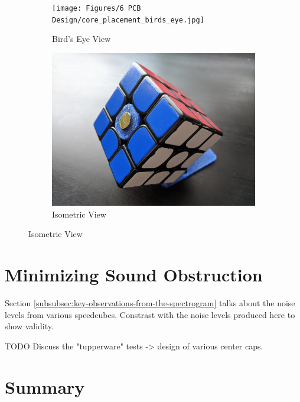 \begin{figure}[h]
    \centering
    \caption{Placement of Circuit Centercap on a Gans 356 Speedcube}
    \label{fig:core-placement}
    \begin{subfigure}{.45\textwidth}
        \centering
        \caption{Bird's Eye View}
        \label{fig:core-placement-birds-eye}
        \texttt{[image: Figures/6 PCB Design/core\_placement\_birds\_eye.jpg]}
    \end{subfigure}
    \begin{subfigure}{.45\textwidth}
        \centering
        \caption{Isometric View}
        \label{fig:core-placement-isometric}
        \includegraphics[width=\linewidth]{Figures/6 PCB Design/core_placement_isometric.jpg}
    \end{subfigure}
\end{figure}

\section{Minimizing Sound Obstruction}
Section \ref{subsubsec:key-observations-from-the-spectrogram} talks about the noise levels from various speedcubes. Constrast with the noise levels produced here to show validity.

TODO Discuss the "tupperware" tests -> design of various center caps.

\section{Summary}
